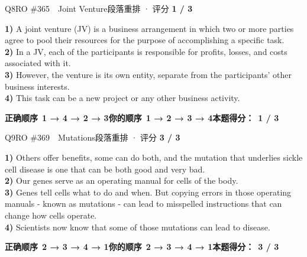 \begin{qblock}{Q8\quad RO \#365\ \ Joint Venture}{段落重排 · 评分 \textcolor{cAccent}{\bfseries 1 / 3}}
\begin{promptbox}
\textbf{1)} A joint venture (JV) is a business arrangement in which two or more parties agree to pool their resources for the purpose of accomplishing a specific task.\\
\textbf{2)} In a JV, each of the participants is responsible for profits, losses, and costs associated with it.\\
\textbf{3)} However, the venture is its own entity, separate from the participants' other business interests.\\
\textbf{4)} This task can be a new project or any other business activity.
\end{promptbox}
\par\smallskip
\textbf{正确顺序}\ \textcolor{cFix}{\bfseries 1 → 4 → 2 → 3}\qquad\textbf{你的顺序}\ {\color{cWrong}\bfseries 1 → 2 → 3 → 4}\qquad\textbf{本题得分：}\ {\color{cAccent}\bfseries 1 / 3}
\end{qblock}

\begin{qblock}{Q9\quad RO \#369\ \ Mutations}{段落重排 · 评分 \textcolor{cAccent}{\bfseries 3 / 3}}
\begin{promptbox}
\textbf{1)} Others offer benefits, some can do both, and the mutation that underlies sickle cell disease is one that can be both good and very bad.\\
\textbf{2)} Our genes serve as an operating manual for cells of the body.\\
\textbf{3)} Genes tell cells what to do and when. But copying errors in those operating manuals - known as mutations - can lead to misspelled instructions that can change how cells operate.\\
\textbf{4)} Scientists now know that some of those mutations can lead to disease.
\end{promptbox}
\par\smallskip
\textbf{正确顺序}\ \textcolor{cFix}{\bfseries 2 → 3 → 4 → 1}\qquad\textbf{你的顺序}\ \textcolor{cFix}{\bfseries 2 → 3 → 4 → 1}\qquad\textbf{本题得分：}\ {\color{cAccent}\bfseries 3 / 3}
\end{qblock}

